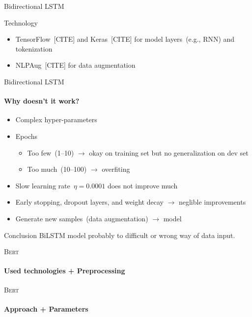 \documentclass[english,handout]{mlutalk}
\newcommand{\Bert}{\textsc{Bert}\xspace}
\newcommand{\BiLSTM}{\mbox{BiLSTM}\xspace}
\newcommand{\todocite}{{\smaller\color{red}[CITE]}\xspace}
\begin{document}
\begin{frame}[allowframebreaks]{Bidirectional LSTM}
  \begin{block}{Technology}
      \begin{itemize}
        \item TensorFlow~\todocite and Keras~\todocite for model layers~(e.g., RNN) and tokenization
        \item NLPAug~\todocite for data augmentation
      \end{itemize}
  \end{block}

\end{frame}

\begin{frame}{Bidirectional LSTM}
  \framesubtitle{Why doesn't it work?}

  \begin{itemize}
    \item Complex hyper-parameters
    \item Epochs
    \begin{itemize}
      \item Too few~(1--10) \(\to\) okay on training set but no generalization on dev set
      \item Too much~(10--100) \(\to\) overfiting
    \end{itemize}
    \item Slow learning rate~\(\eta = 0.0001\) does not improve much
    \item Early stopping, dropout layers, and weight decay \(\to\) neglible improvements
    \item Generate new samples~(data augmentation) \(\to\)  model
  \end{itemize}

  \begin{block}{Conclusion}
    \BiLSTM model probably to difficult or wrong way of data input.
  \end{block}

\end{frame}

\begin{frame}{\Bert}
  \framesubtitle{Used technologies + Preprocessing}
  

\end{frame}

\begin{frame}{\Bert}
  \framesubtitle{Approach + Parameters}
  

\end{frame}
\end{document}
